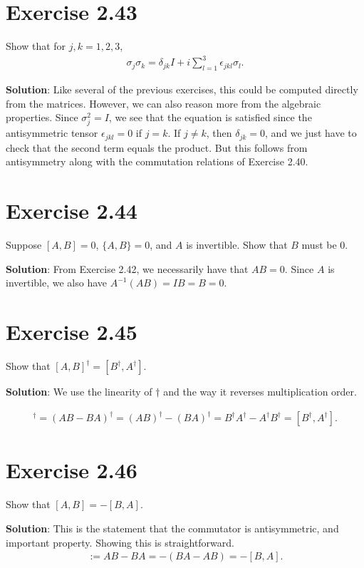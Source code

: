 \documentclass{book}
\begin{document}
\section*{Exercise 2.43}
    Show that for $j,k = 1,2,3$,
    \begin{align}
        \sigma_j \sigma_k = \delta_{jk} I + i \sum_{l=1}^3 \epsilon_{jkl} \sigma_l.
    \end{align}
    
    \textbf{Solution}: Like several of the previous exercises, this could be computed directly from the matrices. However, we can also reason more from the algebraic properties. Since $\sigma_j^2 = I$, we see that the equation is satisfied since the antisymmetric tensor $\epsilon_{jkl} = 0$ if $j = k$. If $j\neq k$, then $\delta_{jk} = 0$, and we just have to check that the second term equals the product. But this follows from antisymmetry along with the commutation relations of Exercise 2.40.
    
\section*{Exercise 2.44}
    Suppose $[A, B] = 0$, $\{A, B\} = 0$, and $A$ is invertible. Show that $B$ must be 0.
    
    \textbf{Solution}: From Exercise 2.42, we necessarily have that $AB = 0$. Since $A$ is invertible, we also have $A^{-1} (AB) = I B = B = 0$. 
    
\section*{Exercise 2.45}
    Show that $[A, B]^\dagger = [B^\dagger, A^\dagger]$.
    
    \textbf{Solution}: We use the linearity of $\dagger$ and the way it reverses multiplication order.
    
    \begin{align}
        [A,B]^\dagger = (AB-BA)^\dagger = (AB)^\dagger - (BA)^\dagger = B^\dagger A^\dagger - A^\dagger B^\dagger = [B^\dagger, A^\dagger].
    \end{align}
    
\section*{Exercise 2.46}
    Show that $[A, B] = -[B, A]$.
    
    \textbf{Solution}: This is the statement that the commutator is antisymmetric, and important property. Showing this is straightforward.
    \begin{align}
        [A,B] :=AB - BA = -(BA-AB) = -[B,A].
    \end{align}
    
\end{document}
